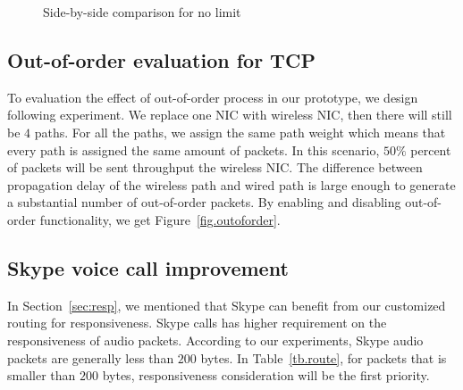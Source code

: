 \begin{figure}[htb]
{
}
\caption{Side-by-side comparison for no limit}
\label{fig.no_limit}
\end{figure}


\subsection{Out-of-order evaluation for TCP}
\label{sec:reoder}

To evaluation the effect of out-of-order process in our prototype, we design following experiment. We replace one NIC with wireless NIC, then there will still be $4$ paths. For all the paths, we assign the same path weight which means that every path is assigned the same amount of packets. In this scenario, $50\%$ percent of packets will be sent throughput the wireless NIC. The difference between propagation delay of the wireless path and wired path is large enough to generate a substantial number of out-of-order packets. By enabling and disabling out-of-order functionality, we get Figure~\ref{fig.outoforder}.


\subsection{Skype voice call improvement}
\label{sec:skype}

In Section~\ref{sec:resp}, we mentioned that Skype can benefit from our customized routing for responsiveness. Skype calls has higher requirement on the responsiveness of audio packets. According to our experiments, Skype audio packets are generally less than $200$ bytes. In Table~\ref{tb.route}, for packets that is smaller than $200$ bytes, responsiveness consideration will be the first priority. 

